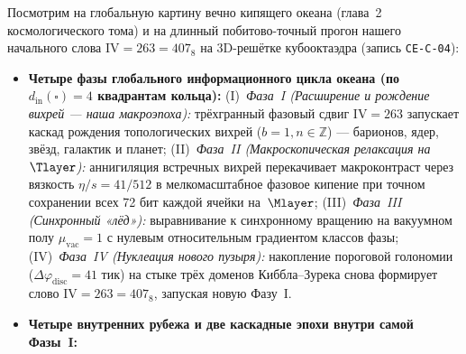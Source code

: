 Посмотрим на глобальную картину вечно кипящего океана (глава~2 космологического тома) и на длинный побитово-точный прогон нашего начального слова $\mathrm{IV} = 263 = 407_8$ на 3D-решётке кубооктаэдра (запись \texttt{CE-C-04}):
\begin{itemize}[leftmargin=*]
\item \textbf{Четыре фазы глобального информационного цикла океана (по $d_{\mathrm{in}}(\square)=4$ квадрантам кольца):}
  (I)~\emph{Фаза~I (Расширение и рождение вихрей --- наша макроэпоха):} трёхгранный фазовый сдвиг $\mathrm{IV}=263$ запускает каскад рождения топологических вихрей ($b=1, n\in\mathbb{Z}$) --- барионов, ядер, звёзд, галактик и планет;
  (II)~\emph{Фаза~II (Макроскопическая релаксация на $\Tlayer$):} аннигиляция встречных вихрей перекачивает макроконтраст через вязкость $\eta/s = 41/512$ в мелкомасштабное фазовое кипение при точном сохранении всех 72 бит каждой ячейки на~$\Mlayer$;
  (III)~\emph{Фаза~III (Синхронный «лёд»):} выравнивание к синхронному вращению на вакуумном полу $\mu_{\mathrm{vac}}=1$ с нулевым относительным градиентом классов фазы;
  (IV)~\emph{Фаза~IV (Нуклеация нового пузыря):} накопление пороговой голономии ($\Delta\varphi_{\mathrm{disc}} = 41$ тик) на стыке трёх доменов Киббла--Зурека снова формирует слово $\mathrm{IV}=263 = 407_8$, запуская новую Фазу~I.
\item \textbf{Четыре внутренних рубежа и две каскадные эпохи внутри самой Фазы~I:}
\end{itemize}
